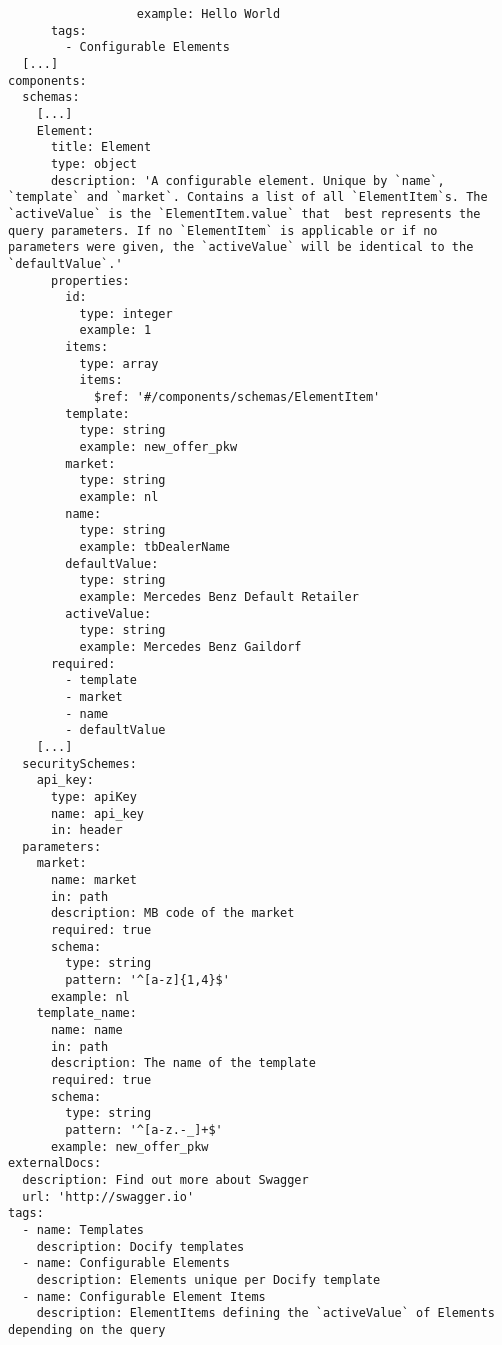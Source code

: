 \begin{lstlisting}
                  example: Hello World
      tags:
        - Configurable Elements
  [...]
components:
  schemas:
    [...]
    Element:
      title: Element
      type: object
      description: 'A configurable element. Unique by `name`, `template` and `market`. Contains a list of all `ElementItem`s. The `activeValue` is the `ElementItem.value` that  best represents the query parameters. If no `ElementItem` is applicable or if no parameters were given, the `activeValue` will be identical to the `defaultValue`.'
      properties:
        id:
          type: integer
          example: 1
        items:
          type: array
          items:
            $ref: '#/components/schemas/ElementItem'
        template:
          type: string
          example: new_offer_pkw
        market:
          type: string
          example: nl
        name:
          type: string
          example: tbDealerName
        defaultValue:
          type: string
          example: Mercedes Benz Default Retailer
        activeValue:
          type: string
          example: Mercedes Benz Gaildorf
      required:
        - template
        - market
        - name
        - defaultValue
    [...]
  securitySchemes:
    api_key:
      type: apiKey
      name: api_key
      in: header
  parameters:
    market:
      name: market
      in: path
      description: MB code of the market
      required: true
      schema:
        type: string
        pattern: '^[a-z]{1,4}$'
      example: nl
    template_name:
      name: name
      in: path
      description: The name of the template
      required: true
      schema:
        type: string
        pattern: '^[a-z.-_]+$'
      example: new_offer_pkw
externalDocs:
  description: Find out more about Swagger
  url: 'http://swagger.io'
tags:
  - name: Templates
    description: Docify templates
  - name: Configurable Elements
    description: Elements unique per Docify template
  - name: Configurable Element Items
    description: ElementItems defining the `activeValue` of Elements depending on the query
\end{lstlisting}
